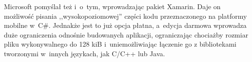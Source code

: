 		Microsoft pomyślał też i~o~tym, wprowadzając pakiet Xamarin. Daje on możliwość pisania ,,wysokopoziomowej'' części kodu przeznaczonego na platformy mobilne w~C\#. Jednakże jest to już opcja płatna, a~edycja darmowa wprowadza duże ograniczenia odnośnie budowanych aplikacji, ograniczając chociażby rozmiar pliku wykonywalnego do 128 kiB i~uniemożliwiając łączenie go z bibliotekami tworzonymi w~innych językach, jak C/C++ lub Java.
		